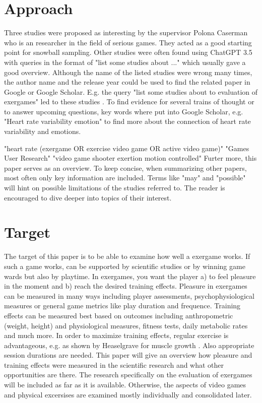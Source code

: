 \section{Approach}
Three studies were proposed as interesting by the supervisor Polona Caserman who is an researcher in the field of serious games. They acted as a good starting point for snowball sampling.
Other studies were often found using ChatGPT 3.5 with queries in the format of "list some studies about ..." which usually gave a good overview. Although the name of the listed studies were wrong many times, the author name and the release year could be used to find the related paper in Google or Google Scholar. 
E.g. the query "list some studies about to evaluation of exergames" led to these studies \cite{fogel2010effects} \cite{lai2013effects}.
To find evidence for several trains of thought or to answer upcoming questions, key words where put into Google Scholar, e.g. "Heart rate variability emotion" to find more about the connection of heart rate variability and emotions.

"heart rate (exergame OR exercise video game OR active video game)"
"Games User Research"
"video game shooter exertion motion controlled"
Furter more, this paper serves as an overview. To keep concise, when summarizing other papers, most often only key information are included. Terms like "may" and "possible" will hint on possible limitations of the studies referred to. The reader is encouraged to dive deeper into topics of their interest. 

\section{Target}
The target of this paper is to be able to examine how well a exergame works. If such a game works, can be supported by scientific studies or by winning game wards \cite{caserman2020quality} but also by playtime. In exergames, you want the player a) to feel pleasure in the moment and b) reach the desired training effects. 
Pleasure in exergames can be measured in many ways including player assessments, psychophysiological measures or general game metrics like play duration and frequence.
Training effects can be measured best based on outcomes including anthropometric (weight, height) and physiological measures, fitness tests, daily metabolic rates and much more.
In order to maximize training effects, regular exercise is advantageous, e.g. as shown by Heaselgrave for muscle growth \cite{heaselgrave2019dose}. Also appropriate session durations are needed.
This paper will give an overview how pleasure and training effects were measured in the scientific research and what other opportunities are there. The research specifically on the evaluation of exergames will be included as far as it is available. Otherwise, the aspects of video games and physical excersises are examined mostly individually and consolidated later.


